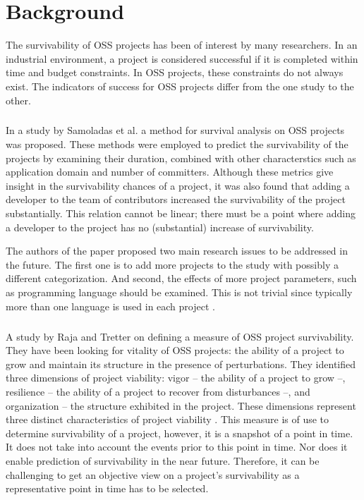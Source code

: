 \chapter{Background}
\label{background}

The survivability of OSS projects has been of interest by many researchers. In
an industrial environment, a project is considered successful if it is completed
within time and budget constraints. In OSS projects, these constraints do not
always exist. The indicators of success for OSS projects differ from the one
study to the other.

\paragraph{}
In a study by Samoladas et al. a method for survival analysis on OSS projects
was proposed. These methods were employed to predict the survivability of the
projects by examining their duration, combined with other characterstics such
as application domain and number of committers. Although these metrics give
insight in the survivability chances of a project, it was also found that
adding a developer to the team of contributors increased the survivability of
the project substantially. This relation cannot be linear; there must be a
point where adding a developer to the project has no (substantial) increase of
survivability.

The authors of the paper proposed two main research issues to be addressed in
the future. The first one is to add more projects to the study with possibly a
different categorization.
And second, the effects of more project parameters, such as programming
language should be examined. This is not trivial since typically more than one
language is used in each project \cite{samoladas2010}.

\paragraph{}
A study by Raja and Tretter on defining a measure of OSS project survivability.
They have been looking for vitality of OSS projects: the ability of a project
to grow and maintain its structure in the presence of perturbations. They
identified three dimensions of project viability: vigor -- the ability of a
project to grow --, resilience -- the ability of a project to recover from
disturbances --, and organization -- the structure exhibited in the project.
These dimensions represent three distinct characteristics of project viability
\cite{raja2012}. This measure is of use to determine survivability of a
project, however, it is a snapshot of a point in time. It does not take into
account the events prior to this point in time. Nor does it enable prediction of
survivability in the near future. Therefore, it can be challenging to get an
objective view on a project's survivability as a representative point in
time has to be selected.

